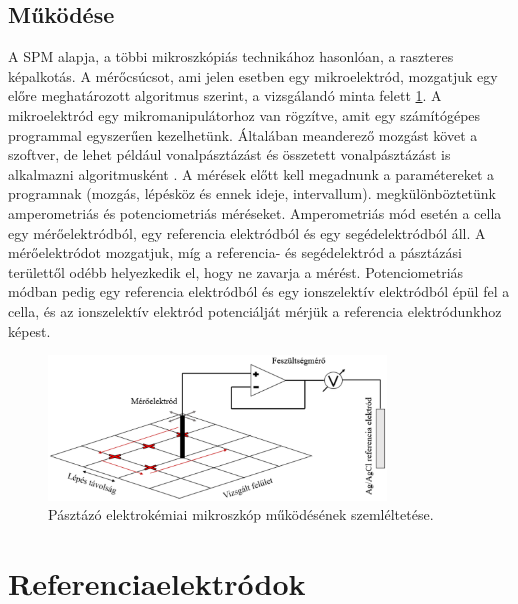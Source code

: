 \subsection{Működése}

A SPM alapja, a többi mikroszkópiás technikához hasonlóan, a raszteres képalkotás. A mérőcsúcsot, ami jelen esetben egy mikroelektród, mozgatjuk egy előre meghatározott algoritmus szerint, a vizsgálandó minta felett \ref{fig:PEKM}. A mikroelektród egy mikromanipulátorhoz van rögzítve, amit egy számítógépes programmal egyszerűen kezelhetünk. Általában meanderező mozgást követ a szoftver, de lehet például vonalpásztázást és összetett vonalpásztázást is alkalmazni algoritmusként \cite{kiss2014new}. A mérések előtt kell megadnunk a paramétereket a programnak (mozgás, lépésköz és ennek ideje, intervallum).  megkülönböztetünk amperometriás és potenciometriás méréseket. Amperometriás mód esetén a cella egy mérőelektródból, egy referencia elektródból és egy segédelektródból áll. A mérőelektródot mozgatjuk, míg a referencia- és segédelektród a pásztázási területtől odébb helyezkedik el, hogy ne zavarja a mérést. Potenciometriás módban pedig egy referencia elektródból és egy ionszelektív elektródból épül fel a cella, és az ionszelektív elektród potenciálját mérjük a referencia elektródunkhoz képest.

\begin{figure}
\centering
\includegraphics[width=0.8\textwidth]{img/spm.eps}
\caption{Pásztázó elektrokémiai mikroszkóp működésének szemléltetése.}
\label{fig:PEKM}
\end{figure}

\section{Referenciaelektródok}

